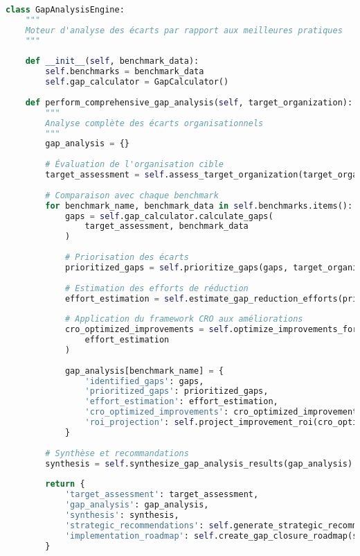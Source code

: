 \begin{lstlisting}[language=Python, caption=Analyseur d'écarts et d'opportunités]
class GapAnalysisEngine:
    """
    Moteur d'analyse des écarts par rapport aux meilleures pratiques
    """
    
    def __init__(self, benchmark_data):
        self.benchmarks = benchmark_data
        self.gap_calculator = GapCalculator()
        
    def perform_comprehensive_gap_analysis(self, target_organization):
        """
        Analyse complète des écarts organisationnels
        """
        gap_analysis = {}
        
        # Évaluation de l'organisation cible
        target_assessment = self.assess_target_organization(target_organization)
        
        # Comparaison avec chaque benchmark
        for benchmark_name, benchmark_data in self.benchmarks.items():
            gaps = self.gap_calculator.calculate_gaps(
                target_assessment, benchmark_data
            )
            
            # Priorisation des écarts
            prioritized_gaps = self.prioritize_gaps(gaps, target_organization['context'])
            
            # Estimation des efforts de réduction
            effort_estimation = self.estimate_gap_reduction_efforts(prioritized_gaps)
            
            # Application du framework CRO aux améliorations
            cro_optimized_improvements = self.optimize_improvements_for_cro(
                effort_estimation
            )
            
            gap_analysis[benchmark_name] = {
                'identified_gaps': gaps,
                'prioritized_gaps': prioritized_gaps,
                'effort_estimation': effort_estimation,
                'cro_optimized_improvements': cro_optimized_improvements,
                'roi_projection': self.project_improvement_roi(cro_optimized_improvements)
            }
            
        # Synthèse et recommandations
        synthesis = self.synthesize_gap_analysis_results(gap_analysis)
        
        return {
            'target_assessment': target_assessment,
            'gap_analysis': gap_analysis,
            'synthesis': synthesis,
            'strategic_recommendations': self.generate_strategic_recommendations(synthesis),
            'implementation_roadmap': self.create_gap_closure_roadmap(synthesis)
        }
    

\end{lstlisting}
